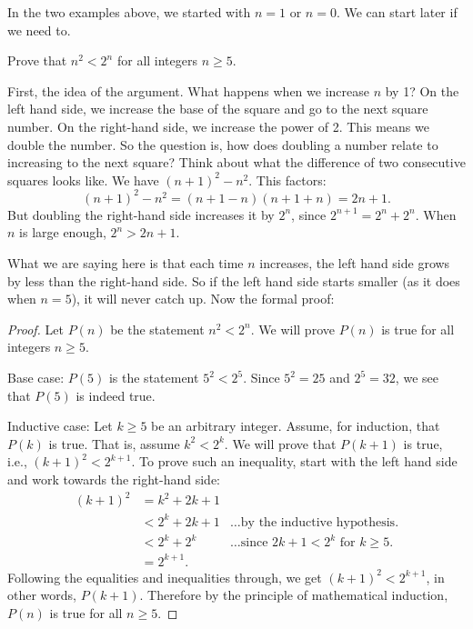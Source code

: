 \documentclass[12pt]{article}
\begin{document}
In the two examples above, we started with $n = 1$ or $n = 0$.  We can start later if we need to.

\begin{example}
  Prove that $n^2 < 2^n$ for all integers $n \ge 5$.
  \begin{solution}
  	First, the idea of the argument.  What happens when we increase $n$ by 1?  On the left hand side, we increase the base of the square and go to the next square number.  On the right-hand side, we increase the power of 2.  This means we double the number.  So the question is, how does doubling a number relate to increasing to the next square?  Think about what the difference of two consecutive squares looks like.  We have $(n+1)^2 - n^2$.  This factors: \[(n+1)^2 - n^2 = (n+1-n)(n+1+n) = 2n+1.\]
    But doubling the right-hand side increases it by $2^n$, since $2^{n+1} = 2^n + 2^n$.  When $n$ is large enough, $2^n > 2n + 1$.

  	What we are saying here is that each time $n$ increases, the left hand side grows by less than the right-hand side.  So if the left hand side starts smaller (as it does when $n = 5$), it will never catch up.  Now the formal proof:

  \begin{proof}
    Let $P(n)$ be the statement $n^2 < 2^n$.
    We will prove $P(n)$ is true for all integers $n \ge 5$.

    Base case: $P(5)$ is the statement $5^2 < 2^5$.  Since $5^2 = 25$ and $2^5 = 32$, we see that $P(5)$ is indeed true.

    Inductive case: Let $k \ge 5$ be an arbitrary integer.  Assume, for induction, that $P(k)$ is true.  That is, assume $k^2 < 2^k$.  We will prove that $P(k+1)$ is true, i.e., $(k+1)^2 < 2^{k+1}$.  To prove such an inequality, start with the left hand side and work towards the right-hand side:
    \begin{align*}
      (k+1)^2 & = k^2 + 2k + 1 &\\
       & < 2^k + 2k + 1 &\mbox{\ldots by the inductive hypothesis.}\\
       & < 2^k + 2^k  &\mbox{\ldots since $2k + 1 < 2^k$ for $k \ge 5$.}\\
       & = 2^{k+1}. &
    \end{align*}
    Following the equalities and inequalities through, we get $(k+1)^2 < 2^{k+1}$, in other words, $P(k+1)$.  Therefore by the principle of mathematical induction, $P(n)$ is true for all $n \ge 5$.
  \end{proof}
	\end{solution}
\end{example}
\end{document}
